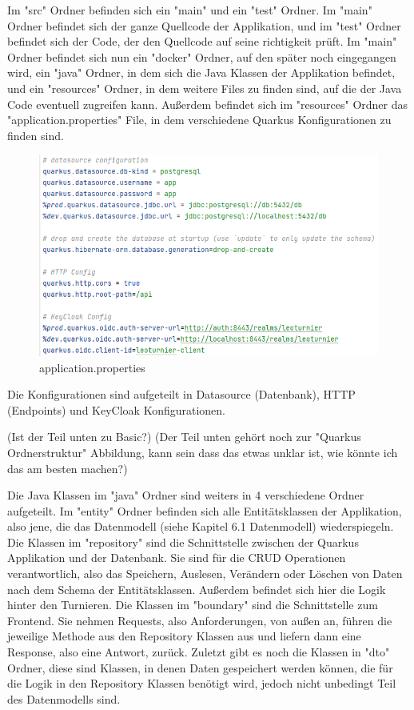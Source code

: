 Im "src" Ordner befinden sich ein "main" und ein "test" Ordner. Im "main" Ordner befindet sich der ganze Quellcode der Applikation, und im "test" Ordner befindet sich der Code, der den Quellcode auf seine richtigkeit prüft.
Im "main" Ordner befindet sich nun ein "docker" Ordner, auf den später noch eingegangen wird, ein "java" Ordner, in dem sich die Java Klassen der Applikation befindet, und ein "resources" Ordner, in dem weitere Files zu finden sind, 
auf die der Java Code eventuell zugreifen kann. Außerdem befindet sich im "resources" Ordner das "application.properties" File, in dem verschiedene Quarkus Konfigurationen zu finden sind.

\begin{figure}[H]
    \includegraphics[scale=0.6]{pics/application.properties.png}
    \caption{application.properties}
\end{figure}

Die Konfigurationen sind aufgeteilt in Datasource (Datenbank), HTTP (Endpoints) und KeyCloak Konfigurationen. 

(Ist der Teil unten zu Basic?) (Der Teil unten gehört noch zur "Quarkus Ordnerstruktur" Abbildung, kann sein dass das etwas unklar ist, wie könnte ich das am besten machen?)

Die Java Klassen im "java" Ordner sind weiters in 4 verschiedene Ordner aufgeteilt. Im "entity" Ordner befinden sich alle Entitätsklassen der Applikation, also jene, die das Datenmodell (siehe Kapitel 6.1 Datenmodell) wiederspiegeln.
Die Klassen im "repository" sind die Schnittstelle zwischen der Quarkus Applikation und der Datenbank. Sie sind für die CRUD Operationen verantwortlich, also das Speichern, Auslesen, Verändern oder Löschen von Daten nach dem Schema der Entitätsklassen.
Außerdem befindet sich hier die Logik hinter den Turnieren. Die Klassen im "boundary" sind die Schnittstelle zum Frontend. Sie nehmen Requests, also Anforderungen, von außen an, 
führen die jeweilige Methode aus den Repository Klassen aus und liefern dann eine Response, also eine Antwort, zurück. Zuletzt gibt es noch die Klassen in "dto" Ordner, diese sind Klassen, 
in denen Daten gespeichert werden können, die für die Logik in den Repository Klassen benötigt wird, jedoch nicht unbedingt Teil des Datenmodells sind.

